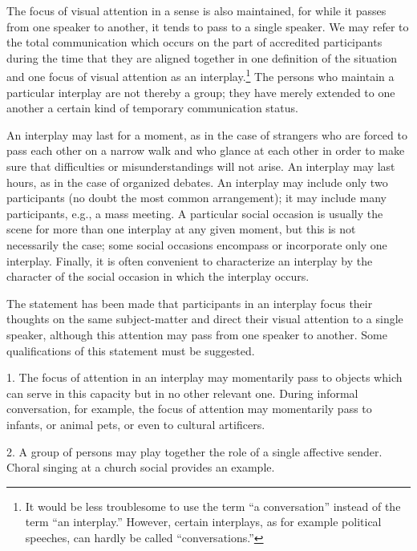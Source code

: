 \documentclass[twoside,symmetric,nobib,justified]{tufte-book}
\begin{document}
The focus of visual attention in a sense is also maintained, for while
it passes from one speaker to another, it tends to pass to a single
speaker. We may refer to the total communication which occurs on the
part of accredited participants during the time that they are aligned
together in one definition of the situation and one focus of visual
attention as an interplay.\footnote{It would be less troublesome to use
  the term ``a conversation'' instead of the term ``an interplay.''
  However, certain interplays, as for example political speeches, can
  hardly be called ``conversations.''} The persons who maintain a
particular interplay are not thereby a group; they have merely extended
to one another a certain kind of temporary communication status.

An interplay may last for a moment, as in the case of strangers who are
forced to pass each other on a narrow walk and who glance at each other
in order to make sure that difficulties or misunderstandings will not
arise. An interplay may last hours, as in the case of organized debates.
An interplay may include only two participants (no doubt the most common
arrangement); it may include many participants, e.g., a mass meeting. A
particular social occasion is usually the scene for more than one
interplay at any given moment, but this is not necessarily the case;
some social occasions encompass or incorporate only one interplay.
Finally, it is often convenient to characterize an interplay by the
character of the social occasion in which the interplay occurs.

The statement has been made that participants in an interplay focus
their thoughts on the same subject-matter and direct their visual
attention to a single speaker, although this attention may pass from one
speaker to another. Some qualifications of this statement must be
suggested.

\enlargethispage{\baselineskip}

1. The focus of attention in an interplay may momentarily pass to
objects which can serve in this capacity but in no other relevant one.
During informal conversation, for example, the focus of attention may
momentarily pass to infants, or animal pets, or even to cultural
artificers.

\enlargethispage{\baselineskip}

2. A group of persons may play together the role of a single affective
sender. Choral singing at a church social provides an example.
\end{document}
